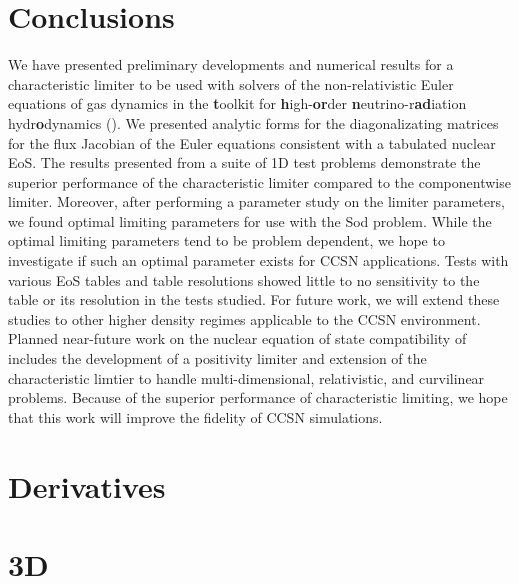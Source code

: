 \documentclass[onecolumn]{aastex62}
\begin{document}
\section{Conclusions}

We have presented preliminary developments and numerical results for a
characteristic limiter to be used with solvers of the non-relativistic
Euler equations of gas dynamics in the {\bf t}oolkit for {\bf h}igh-{\bf or}der
{\bf n}eutrino-r{\bf ad}iation hydr{\bf o}dynamics (\thornado). We presented analytic
forms for the diagonalizating matrices for the flux Jacobian of the Euler equations
consistent with a tabulated nuclear EoS.
The results presented from a suite of 1D test problems
demonstrate the superior performance of the characteristic limiter
compared to the componentwise limiter. Moreover, after performing a parameter
study on the limiter parameters, we found optimal limiting
parameters for use with the Sod problem. While the optimal limiting parameters
tend to be problem dependent, we hope to investigate if such an optimal
parameter exists for CCSN applications. Tests with various EoS tables and
table resolutions showed little to no sensitivity to the table or its
resolution in the tests studied. For future work, we will extend these studies
to other higher density regimes applicable to the CCSN environment.
Planned near-future work on the nuclear equation of state compatibility of
\thornado\, includes the development of a positivity limiter and extension of
the characteristic limtier to handle multi-dimensional, relativistic, and curvilinear problems.
Because of the superior performance of characteristic limiting, we hope that
this work will improve the fidelity of CCSN simulations.



\appendix

\section{Derivatives}
\label{appendix:deriv}


\section{3D}
\label{appendix:3d}




\end{document}
